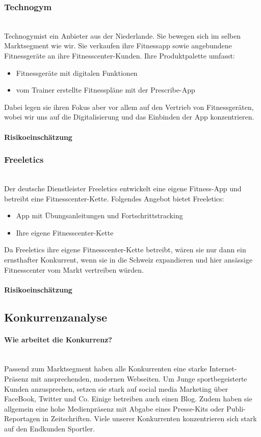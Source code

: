 \subsubsection{Technogym}\hfill \\
Technogym\cite{technogym}ist ein Anbieter aus der Niederlande. Sie bewegen sich im selben Marktsegment wie wir. Sie verkaufen ihre Fitnessapp sowie angebundene Fitnessgeräte an ihre Fitnesscenter-Kunden.
Ihre Produktpalette umfasst:
\begin{itemize}
	\item Fitnessgeräte mit digitalen Funktionen
	\item vom Trainer erstellte Fitnesspläne mit der Prescribe-App
\end{itemize}
Dabei legen sie ihren Fokus aber vor allem auf den Vertrieb von Fitnessgeräten, wobei wir uns auf die Digitalisierung und das Einbinden der App konzentrieren.
\paragraph{Risikoeinschätzung} \qquad {}
\subsubsection{Freeletics}\hfill \\
Der deutsche Dienstleister Freeletics\cite{freeletics} entwickelt eine eigene Fitness-App und betreibt eine Fitnesscenter-Kette.
Folgendes Angebot bietet Freeletics:
\begin{itemize}
	\item App mit Übungsanleitungen und Fortschrittstracking
	\item Ihre eigene Fitnesscenter-Kette
\end{itemize}
Da Freeletics ihre eigene Fitnesscenter-Kette betreibt, wären sie nur dann ein ernsthafter Konkurrent, wenn sie in die Schweiz expandieren und hier ansässige Fitnesscenter vom Markt vertreiben würden.
\paragraph{Risikoeinschätzung} \qquad {}
\subsection{Konkurrenzanalyse}
\paragraph{Wie arbeitet die Konkurrenz?} \hfill \\
Passend zum Marktsegment haben alle Konkurrenten eine starke Internet-Präsenz mit ansprechenden, modernen Webseiten. 
Um Junge sportbegeisterte Kunden anzusprechen, setzen sie stark auf social media Marketing über FaceBook, Twitter und Co. Einige betreiben auch einen Blog. Zudem haben sie allgemein eine hohe Medienpräsenz mit Abgabe eines Presse-Kits oder Publi-Reportagen in Zeitschriften. Viele unserer Konkurrenten konzentrieren sich stark auf den Endkunden Sportler.

